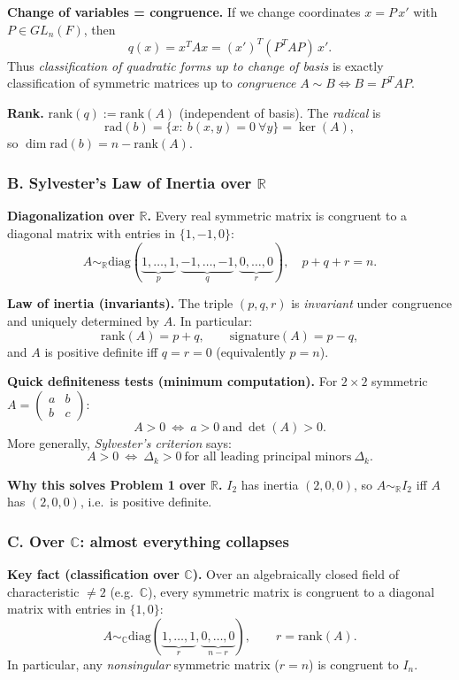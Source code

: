 \documentclass[12pt,a4paper]{article}
\theoremstyle{plain}
\theoremstyle{definition}      %
\begin{document}
\textbf{Change of variables = congruence.}
If we change coordinates $x=P\,x'$ with $P\in GL_n(F)$, then
\[
q(x)=x^T A x = (x')^T (P^T A P)\,x'.
\]
Thus \emph{classification of quadratic forms up to change of basis} is exactly classification of symmetric matrices up to \emph{congruence} $A\sim B \iff B=P^TAP$.

\textbf{Rank.}
$\mathrm{rank}(q):=\mathrm{rank}(A)$ (independent of basis). The \emph{radical} is
\[
\mathrm{rad}(b)=\{x:\ b(x,y)=0\ \forall y\}=\ker(A),
\]
so $\dim \mathrm{rad}(b)=n-\mathrm{rank}(A)$.

\subsubsection*{B. Sylvester’s Law of Inertia over $\mathbb R$}

\textbf{Diagonalization over $\mathbb R$.}
Every real symmetric matrix is congruent to a diagonal matrix with entries in $\{1,-1,0\}$:
\[
A \sim_{\mathbb R} \mathrm{diag}(\underbrace{1,\dots,1}_{p},
\underbrace{-1,\dots,-1}_{q},
\underbrace{0,\dots,0}_{r}),
\quad p+q+r=n.
\]

\textbf{Law of inertia (invariants).}
The triple $(p,q,r)$ is \emph{invariant} under congruence and uniquely determined by $A$.
In particular:
\[
\mathrm{rank}(A)=p+q,\qquad \text{signature}(A)=p-q,
\]
and $A$ is positive definite iff $q=r=0$ (equivalently $p=n$).

\textbf{Quick definiteness tests (minimum computation).}
For $2\times 2$ symmetric $A=\begin{pmatrix}a&b\\b&c\end{pmatrix}$:
\[
A>0\ \Longleftrightarrow\ a>0\ \text{and}\ \det(A)>0.
\]
More generally, \emph{Sylvester’s criterion} says:
\[
A>0\ \Longleftrightarrow\ \Delta_k>0\ \text{for all leading principal minors}\ \Delta_k.
\]

\textbf{Why this solves Problem 1 over $\mathbb R$.}
$I_2$ has inertia $(2,0,0)$, so $A\sim_{\mathbb R}I_2$ iff $A$ has $(2,0,0)$, i.e.\ is positive definite.

\subsubsection*{C. Over $\mathbb C$: almost everything collapses}

\textbf{Key fact (classification over $\mathbb C$).}
Over an algebraically closed field of characteristic $\neq 2$ (e.g.\ $\mathbb C$),
every symmetric matrix is congruent to a diagonal matrix with entries in $\{1,0\}$:
\[
A \sim_{\mathbb C} \mathrm{diag}(\underbrace{1,\dots,1}_{r},\underbrace{0,\dots,0}_{n-r}),
\qquad r=\mathrm{rank}(A).
\]
In particular, any \emph{nonsingular} symmetric matrix ($r=n$) is congruent to $I_n$.
\end{document}
